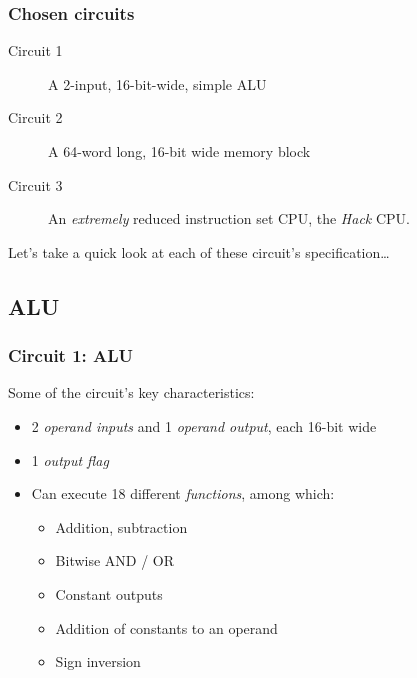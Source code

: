     \begin{frame}
        \frametitle{Chosen circuits}

        \begin{description}
            \item[Circuit 1] A 2-input, 16-bit-wide, simple ALU
            \item[Circuit 2] A 64-word long, 16-bit wide memory block
            \item[Circuit 3] An \emph{extremely} reduced instruction set CPU,
                the \emph{Hack} CPU.
        \end{description}
        \vspace{0.05\textwidth}

        \par{Let's take a quick look at each of these circuit's specification\ldots}
    \end{frame}


    \subsection{ALU}
    \label{subsec:alu}
        \begin{frame}
            \frametitle{Circuit 1: ALU}

            \par{Some of the circuit's key characteristics:}

            \begin{itemize}
                \item 2 \emph{operand inputs} and 1 \emph{operand output}, each 16-bit wide
                \item 1 \emph{output flag}
                \item Can execute 18 different \emph{functions}, among which:
                    \begin{itemize}
                        \item Addition, subtraction
                        \item Bitwise AND / OR
                        \item Constant outputs
                        \item Addition of constants to an operand
                        \item Sign inversion
                    \end{itemize}
            \end{itemize}
        \end{frame}

